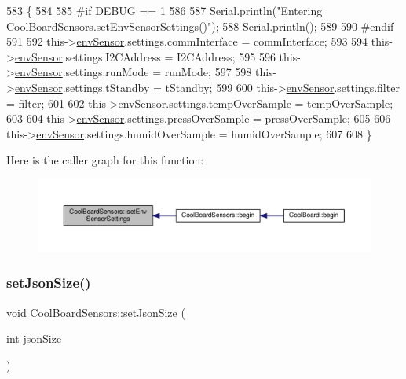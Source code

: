 \begin{DoxyCode}
583 \{
584 
585 \textcolor{preprocessor}{#if DEBUG == 1}
586     
587     Serial.println(\textcolor{stringliteral}{"Entering CoolBoardSensors.setEnvSensorSettings()"});
588     Serial.println();
589 
590 \textcolor{preprocessor}{#endif}
591   
592     this->\hyperlink{classCoolBoardSensors_a868e38985e9a2412829fa2790ca13e2e}{envSensor}.settings.commInterface = commInterface;      
593 
594     this->\hyperlink{classCoolBoardSensors_a868e38985e9a2412829fa2790ca13e2e}{envSensor}.settings.I2CAddress = I2CAddress;
595 
596     this->\hyperlink{classCoolBoardSensors_a868e38985e9a2412829fa2790ca13e2e}{envSensor}.settings.runMode = runMode; 
597 
598     this->\hyperlink{classCoolBoardSensors_a868e38985e9a2412829fa2790ca13e2e}{envSensor}.settings.tStandby = tStandby; 
599 
600     this->\hyperlink{classCoolBoardSensors_a868e38985e9a2412829fa2790ca13e2e}{envSensor}.settings.filter = filter; 
601 
602     this->\hyperlink{classCoolBoardSensors_a868e38985e9a2412829fa2790ca13e2e}{envSensor}.settings.tempOverSample = tempOverSample;
603 
604     this->\hyperlink{classCoolBoardSensors_a868e38985e9a2412829fa2790ca13e2e}{envSensor}.settings.pressOverSample = pressOverSample;
605 
606     this->\hyperlink{classCoolBoardSensors_a868e38985e9a2412829fa2790ca13e2e}{envSensor}.settings.humidOverSample = humidOverSample;
607 
608 \}
\end{DoxyCode}
Here is the caller graph for this function\+:\nopagebreak
\begin{figure}[H]
\begin{center}
\leavevmode
\includegraphics[width=350pt]{classCoolBoardSensors_a406307ffd70272282d91479c7ed8d66f_icgraph}
\end{center}
\end{figure}
\mbox{\label{classCoolBoardSensors_ab76e6dbd6efbcc25ff460535badd8d45}} 
\subsubsection{\texorpdfstring{set\+Json\+Size()}{setJsonSize()}}
{\footnotesize\ttfamily void Cool\+Board\+Sensors\+::set\+Json\+Size (\begin{DoxyParamCaption}\item[{int}]{json\+Size }\end{DoxyParamCaption})}

